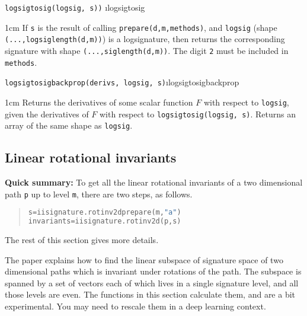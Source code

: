 \documentclass[a4paper]{extarticle}
\newenvironment{defn}{\begin{adjustwidth}{1cm}{}\ignorespaces}{\end{adjustwidth}\ignorespacesafterend}
\begin{document}
\verb!logsigtosig(logsig, s))! \i{logsigtosig}

\begin{defn}
\nopagebreak If \verb!s! is the result of calling \verb!prepare(d,m,methods)!,
and \texttt{logsig} (shape \verb|(...,logsiglength(d,m))|) is a logsignature,
then returns the corresponding signature with shape  \verb|(...,siglength(d,m))|.
The digit \texttt{2} must be included in \texttt{methods}.
\end{defn}

\verb!logsigtosigbackprop(derivs, logsig, s)!\i{logsigtosigbackprop}

\begin{defn}
\nopagebreak Returns the derivatives of some scalar function $F$ with respect to \verb|logsig|, given
the derivatives of $F$ with respect to \verb!logsigtosig(logsig, s)!.
Returns an array of the same shape as \verb|logsig|.
\end{defn}

\subsection{Linear rotational invariants}
\begin{center}
	\begin{minipage}{0.7\textwidth}
		\noindent\textbf{Quick summary:} To get all the linear rotational invariants of a two dimensional path \verb!p! up to level \verb!m!, there are two steps, as follows.
		\begin{quotation}
\begin{lstlisting}[language=Python,keywordstyle=\bf]
s=iisignature.rotinv2dprepare(m,"a")
invariants=iisignature.rotinv2d(p,s)
\end{lstlisting}
		\end{quotation}
		The rest of this section gives more details.
	\end{minipage}
\end{center}

The paper \cite{JD} explains how to find the linear subspace of signature space of two dimensional paths which is invariant under rotations of the path. The subspace is spanned by a set of vectors each of which lives in a single signature level, and all those levels are even. The functions in this section calculate them, and are a bit experimental. You may need to rescale them in a deep learning context. 
\end{document}
